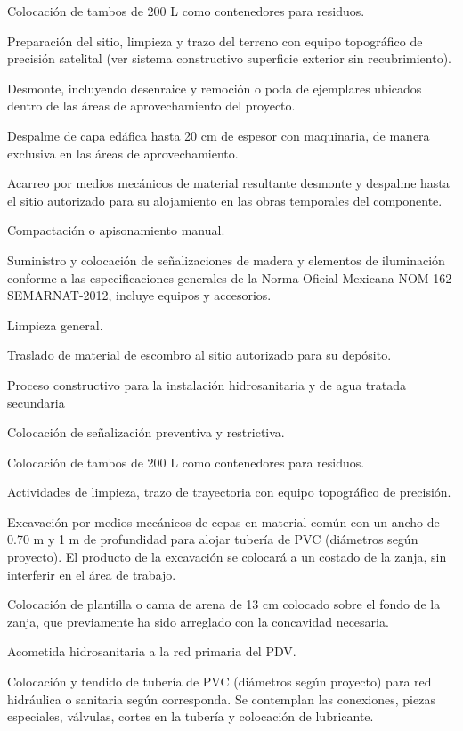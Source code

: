 \documentclass{article}
\begin{document}
Colocación de tambos de 200 L como contenedores para residuos.

Preparación del sitio, limpieza y trazo del terreno con equipo topográfico de precisión satelital (ver sistema constructivo superficie exterior sin recubrimiento).

Desmonte, incluyendo desenraice y remoción o poda de ejemplares ubicados dentro de las áreas de aprovechamiento del proyecto.

Despalme de capa edáfica hasta 20 cm de espesor con maquinaria, de manera exclusiva en las áreas de aprovechamiento.

Acarreo por medios mecánicos de material resultante desmonte y despalme hasta el sitio autorizado para su alojamiento en las obras temporales del componente.

Compactación o apisonamiento manual.

Suministro y colocación de señalizaciones de madera y elementos de iluminación conforme a las especificaciones generales de la Norma Oficial Mexicana NOM-162-SEMARNAT-2012, incluye equipos y accesorios.

Limpieza general.

Traslado de material de escombro al sitio autorizado para su depósito.


\bigskip


\bigskip

Proceso constructivo para la instalación hidrosanitaria \newline
y de agua tratada secundaria


\bigskip

Colocación de señalización preventiva y restrictiva.

Colocación de tambos de 200 L como contenedores para residuos.

Actividades de limpieza, trazo de trayectoria con equipo topográfico de precisión.

Excavación por medios mecánicos de cepas en material común con un ancho de 0.70 m y 1 m de profundidad para alojar tubería de PVC (diámetros según proyecto). El producto de la excavación se colocará a un costado de la zanja, sin interferir en el área de trabajo.

Colocación de plantilla o cama de arena de 13 cm colocado sobre el fondo de la zanja, que previamente ha sido arreglado con la concavidad necesaria.

Acometida hidrosanitaria a la red primaria del PDV.

Colocación y tendido de tubería de PVC (diámetros según proyecto) para red hidráulica o sanitaria según corresponda. Se contemplan las conexiones, piezas especiales, válvulas, cortes en la tubería y colocación de lubricante.
\end{document}
